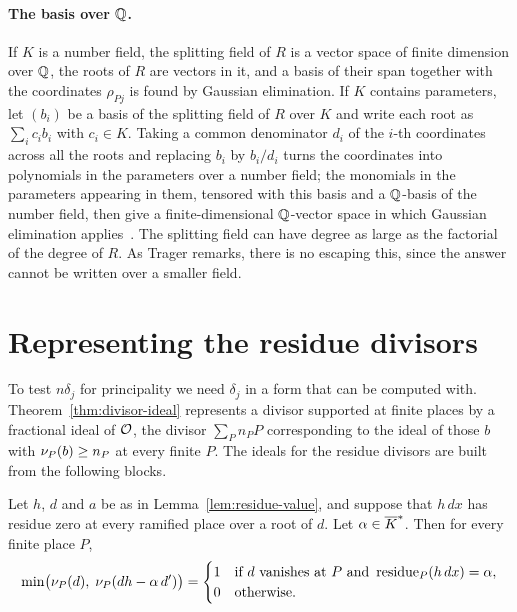 \paragraph{The basis over $\mathbb{Q}$.} If $K$ is a number field, the splitting
field of $R$ is a vector space of finite dimension over $\mathbb{Q}$, the roots of
$R$ are vectors in it, and a basis of their span together with the
coordinates $\rho_{Pj}$ is found by Gaussian elimination. If $K$ contains
parameters, let $(b_i)$ be a basis of the splitting field of $R$ over $K$ and
write each root as $\sum_i c_i b_i$ with $c_i \in K$. Taking a common
denominator $d_i$ of the $i$-th coordinates across all the roots and
replacing $b_i$ by $b_i / d_i$ turns the coordinates into polynomials in the
parameters over a number field; the monomials in the parameters appearing in
them, tensored with this basis and a $\mathbb{Q}$-basis of the number field, then
give a finite-dimensional $\mathbb{Q}$-vector space in which Gaussian elimination
applies~\cite[\S5.2]{trager1984}. The splitting field
can have degree as large as the factorial of the degree of $R$. As Trager
remarks, there is no escaping this, since the answer cannot be written over a
smaller field.

\section{Representing the residue divisors}\label{sec:log-ideals}

To test $n \delta_j$ for principality we need $\delta_j$ in a form that can be
computed with. Theorem~\ref{thm:divisor-ideal} represents a divisor supported at
finite places by a fractional ideal of $\mathcal{O}$, the divisor $\sum_P n_P P$
corresponding to the ideal of those $b$ with $\nu_{P}(b) \ge n_P$ at every
finite $P$. The ideals for the residue divisors are built from the following
blocks.

\begin{proposition}\label{prop:residue-ideal}
Let $h$, $d$ and $a$ be as in Lemma~\ref{lem:residue-value}, and suppose that
$h\,dx$ has residue zero at every ramified place over a root of $d$. Let
$\alpha \in \overline{K}^*$. Then for every finite place $P$,
\[
  \min\bigl( \nu_{P}(d),\; \nu_{P}(d h - \alpha\, d') \bigr) =
  \begin{cases}
    1 & \text{if $d$ vanishes at $P$ and } \operatorname{residue}_P(h\,dx) = \alpha, \\
    0 & \text{otherwise.}
  \end{cases}
\]
\end{proposition}

